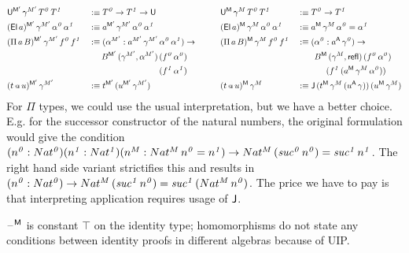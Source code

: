 \documentclass[acmsmall,review]{acmart}\settopmatter{printfolios=true,printccs=false,printacmref=false}
\begin{document}
\begin{alignat*}{10}
  & \U^{\M'}\,\gamma^{M'}\,T^{\mathit{0}}\,T^{\mathit{1}} && :\equiv T^{\mathit{0}}\ra T^{\mathit{1}}\ra\U  && \U^\M\,\gamma^M\,T^{\mathit{0}}\,T^{\mathit{1}} && :\equiv T^{\mathit{0}}\ra T^{\mathit{1}} \\
  & (\El\,a)^{\M'}\,\gamma^{M'}\,\alpha^{\mathit{0}}\,\alpha^{\mathit{1}} && :\equiv a^{\M'}\,\gamma^{M'}\,\alpha^{\mathit{0}}\,\alpha^{\mathit{1}} && (\El\,a)^\M\,\gamma^M\,\alpha^{\mathit{0}}\,\alpha^{\mathit{1}} && :\equiv a^\M\,\gamma^M\,\alpha^{\mathit{0}} = \alpha^{\mathit{1}} \\
  & (\Pi\,a\,B)^{\M'}\,\gamma^{M'}\,f^{\mathit{0}}\,f^{\mathit{1}} && :\equiv (\alpha^{M'}:a^{M'}\,\gamma^{M'}\,\alpha^{\mathit{0}}\,\alpha^{\mathit{1}})\ra\hspace{2em}  && (\Pi\,a\,B)^\M\,\gamma^M\,f^{\mathit{0}}\,f^{\mathit{1}} && :\equiv (\alpha^{\mathit{0}}:a^\A\,\gamma^{\mathit{0}})\ra \\
  &  && \hspace{1.5em} B^{\M'}\,(\gamma^{M'}, \alpha^{M'})\,(f^{\mathit{0}}\,\alpha^{\mathit{0}}) &&  && \hspace{2em} B^\M\,(\gamma^M, \refl)\,(f^{\mathit{0}}\,\alpha^{\mathit{0}}) \\
  &  && \hspace{1.5em} \hphantom{B^{\M'}\,(\gamma^{M'}, \alpha^{M'})\,} (f^{\mathit{1}}\,\alpha^{\mathit{1}}) &&  && \hspace{3.4em}(f^{\mathit{1}}\,(a^\M\,\gamma^M\,\alpha^{\mathit{0}})) \\
  & (t\app u)^{\M'}\,\gamma^{M'} && :\equiv t^{\M'}\,(u^{\M'}\,\gamma^{M'}) && (t\app u)^\M\,\gamma^M && :\equiv \J\,(t^\M\,\gamma^M\,(u^\A\,\gamma))\,(u^\M\,\gamma^M)
\end{alignat*}
For $\Pi$ types, we could use the usual interpretation, but we have a
better choice. E.g. for the successor constructor of the natural
numbers, the original formulation would give the condition
$(n^{\mathit{0}}:Nat^{\mathit{0}})(n^{\mathit{1}}:Nat^{\mathit{1}})(n^{M}:Nat^M\,n^{\mathit{0}}
= n^{\mathit{1}})\rightarrow
Nat^M\,(\mathit{suc}^{\mathit{0}}\,n^{\mathit{0}}) =
\mathit{suc^{\mathit{1}}}\, n^{\mathit{1}}$. The right hand side
variant strictifies this and results in
$(n^{\mathit{0}}:Nat^{\mathit{0}})\rightarrow
Nat^M\,(\mathit{suc}^{\mathit{1}}\,n^{\mathit{0}}) =
\mathit{suc}^{\mathit{1}}\,(Nat^M\,n^{\mathit{0}})$. The price we have
to pay is that interpreting application requires usage of $\mathsf{J}$.

$\mathord{\hspace{1pt}\text{--}\hspace{1pt}}^{\mathsf{M}}$ is constant $\top$ on the identity type; homomorphisms
do not state any conditions between identity proofs in different
algebras because of UIP.
\end{document}
